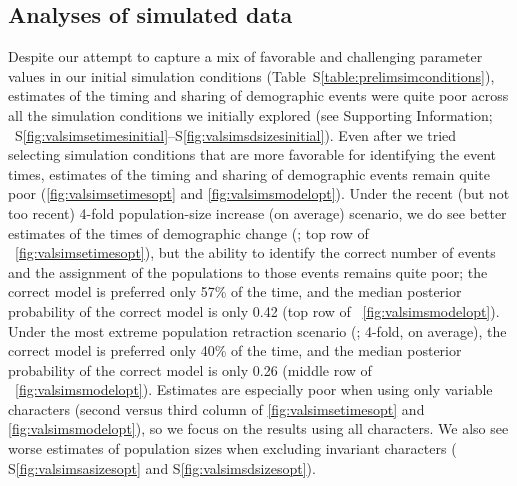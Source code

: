 \subsection{Analyses of simulated data}


Despite our attempt to capture a mix of favorable and challenging parameter
values in our initial simulation conditions (Table~S\ref{table:prelimsimconditions}),
estimates of the timing and sharing of demographic events were quite poor
across all the simulation conditions we initially explored
(see Supporting Information;
\figs{}~S\ref{fig:valsimsetimesinitial}--S\ref{fig:valsimsdsizesinitial}).
Even after we tried selecting simulation conditions that are more favorable for
identifying the event times, estimates of the timing and
sharing of demographic events remain quite poor
(\figs \ref{fig:valsimsetimesopt} and \ref{fig:valsimsmodelopt}).
Under the recent (but not too recent) 4-fold population-size increase (on
average) scenario, we do see better estimates of the times of demographic
change
(\vsimfourinc; top row of \fig{}~\ref{fig:valsimsetimesopt}),
but the ability to identify the correct number of events and the assignment of
the populations to those events remains quite poor;
the correct model is preferred only 57\% of the time, and the
median posterior probability of the correct model is only 0.42
(top row of \fig{}~\ref{fig:valsimsmodelopt}).
Under the most extreme population retraction scenario
(\vsimfourdec; 4-fold, on average),
the correct model is preferred only 40\% of the time, and the median
posterior probability of the correct model is only 0.26
(middle row of \fig{}~\ref{fig:valsimsmodelopt}).
Estimates are especially poor when using only variable characters
(second versus third column of \figs
\ref{fig:valsimsetimesopt}
and
\ref{fig:valsimsmodelopt}),
so we focus on the results using all characters.
We also see worse estimates of population sizes when excluding invariant
characters
(\figs
S\ref{fig:valsimsasizesopt}
and
S\ref{fig:valsimsdsizesopt}).

\ifembed{

}{}

